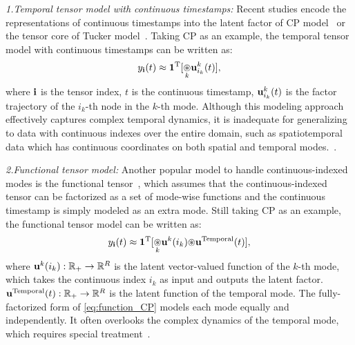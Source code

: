 \textit{1.Temporal tensor model with continuous timestamps:} Recent studies encode the representations of continuous timestamps into the latent factor of  CP model~\citep{SFTL, NONFAT} or the tensor core of  Tucker model~\citep{bctt}. 
Taking CP as an example, the temporal tensor model with continuous timestamps can be written as:
\vspace{-2mm}
\begin{align}
    y_{\mathbf{i}}(t) \approx \boldsymbol{1}^{\mathrm{T}}[\underset{k}{\circledast} 
    \mathbf{u}_{i_k}^k(t)], \label{eq:temporal_CP}
\end{align}
where $\mathbf{i}$ is the tensor index, $t$ is the continuous timestamp, $\mathbf{u}_{i_k}^k(t)$ is the factor trajectory of the $i_k$-th node in the $k$-th mode. Although this modeling approach effectively captures complex temporal dynamics, it is inadequate for generalizing to data with continuous indexes over the entire domain, such as spatiotemporal data which has continuous coordinates on both spatial and temporal modes.~\citep{hamdi2022spatiotemporal}. 

\textit{2.Functional tensor model:} 
Another popular model to handle  continuous-indexed modes is the functional tensor~\citep{schmidt2009function_tensor, luo2023lowrank, Ballester-Ripoll_Paredes_Pajarola_2019_tt}, which assumes that the continuous-indexed tensor can be factorized as a set of mode-wise functions and the continuous timestamp is simply modeled as an extra mode. Still taking CP as an example, the functional tensor model can be written as:
\begin{align}
    y_{\mathbf{i}}(t) \approx  \boldsymbol{1}^{\mathrm{T}}[\underset{k}{\circledast} 
    \mathbf{u}^k(i_k){\circledast} \mathbf{u}^{\text{Temporal}}(t) ],\label{eq:function_CP}
\end{align} 
where  $\mathbf{u}^k(i_k): \mathbb{R}_{+} \to \mathbb{R}^{R}$ is the latent vector-valued function of the $k$-th mode, which takes the continuous index $i_k$ as input and outputs the  latent factor. $\mathbf{u}^{\text{Temporal}}(t) : \mathbb{R}_{+} \to \mathbb{R}^{R}$ is the latent function of the temporal mode. 
The fully-factorized form of \eqref{eq:function_CP} models each mode equally and independently. It often overlooks the complex dynamics of the temporal mode, which requires special treatment~\citep{hamdi2022spatiotemporal}.



